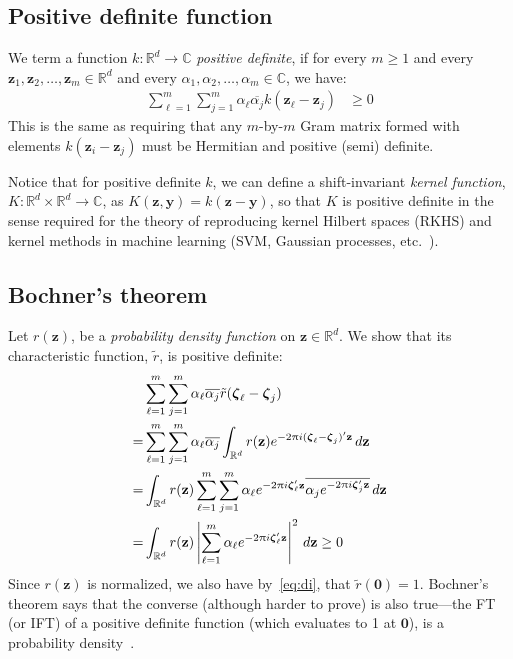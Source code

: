 \documentclass[a4paper,oneside,12pt,english]{report}
\def\zvec{\mathbf{z}}
\def\R{\mathbb{R}}
\def\yvec{\mathbf{y}}
\def\nulvec{\boldsymbol{0}}
\def\funcdef#1#2#3{#1:#2\to#3}
\def\C{\mathbb{C}}
\def\conj#1{\overline{#1}}
\begin{document}
\subsection{Positive definite function}
We term a function $\funcdef{k}{\R^d}{\C}$ \emph{positive definite}, if for every $m\ge1$ and every $\zvec_1,\zvec_2,\ldots,\zvec_m\in\R^d$ and every $\alpha_1,\alpha_2,\ldots,\alpha_m\in\C$, we have:
\begin{align}
\sum_{\ell=1}^m \sum_{j=1}^m \alpha_\ell\conj{\alpha_j} k(\zvec_\ell-\zvec_j) &\ge 0 
\end{align}
This is the same as requiring that any $m$-by-$m$ Gram matrix formed with elements $k(\zvec_i-\zvec_j)$ must be Hermitian and positive (semi) definite.

Notice that for positive definite $k$, we can define a shift-invariant \emph{kernel function}, $\funcdef{K}{\R^d\times\R^d}{\C}$, as $K(\zvec,\yvec)=k(\zvec-\yvec)$, so that $K$ is positive definite in the sense required for the theory of reproducing kernel Hilbert spaces (RKHS) and kernel methods in machine learning (SVM, Gaussian processes, etc.\ ). 

\subsection{Bochner's theorem}
Let $r(\zvec)$, be a \emph{probability density function} on $\zvec\in\R^d$. We show that its characteristic function, $\tilde r$, is positive definite:
\begin{align}
\begin{split}
&\sum_{\ell=1}^m \sum_{j=1}^m \alpha_\ell\conj{\alpha_j} \tilde r(\zetavec_\ell-\zetavec_j)  \\
=&\sum_{\ell=1}^m \sum_{j=1}^m \alpha_\ell\conj{\alpha_j} \int_{\R^d}r(\zvec)e^{-2\uppi i(\zetavec_\ell-\zetavec_j)'\zvec}\,d\zvec \\
=&\int_{\R^d}r(\zvec)\sum_{\ell=1}^m \sum_{j=1}^m \alpha_\ell e^{-2\uppi i\zetavec_\ell'\zvec}\conj{\alpha_j e^{-2\uppi i\zetavec_j'\zvec}}\,d\zvec \\
=&\int_{\R^d}r(\zvec)\left\lvert\sum_{\ell=1}^m \alpha_\ell e^{-2\uppi i\zetavec_\ell'\zvec}\right\rvert^2\,d\zvec \ge 0\\
\end{split}
\end{align}
Since $r(\zvec)$ is normalized, we also have by~\eqref{eq:di}, that $\tilde r(\nulvec)=1$. Bochner's theorem says that the converse (although harder to prove) is also true---the FT (or IFT) of a positive definite function (which evaluates to 1 at $\nulvec$), is a probability density~\cite{SteinWeiss}.  
\end{document}
